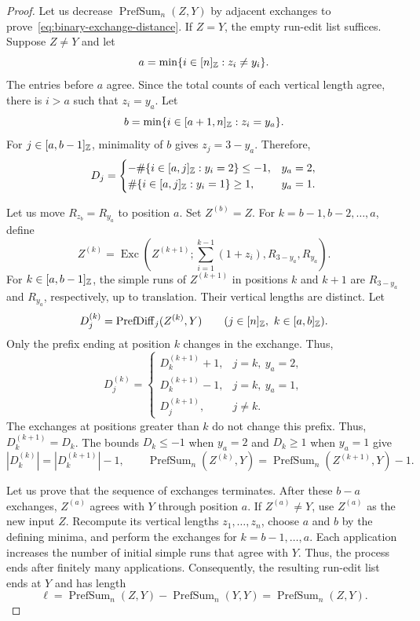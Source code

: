 \begin{proof}
Let us decrease $\operatorname{PrefSum}_n(Z,Y)$ by adjacent exchanges to prove~\eqref{eq:binary-exchange-distance}.
If $Z=Y$, the empty run-edit list suffices. Suppose $Z\ne Y$ and let
\[
 a=\min\{i\in[n]_{\mathbb Z}:z_i\ne y_i\}.
\]
The entries before $a$ agree. Since the total counts of each vertical length agree, there is $i>a$ such that $z_i=y_a$.
Let
\[
 b=\min\{i\in[a+1,n]_{\mathbb Z}:z_i=y_a\}.
\]
For $j\in[a,b-1]_{\mathbb Z}$, minimality of $b$ gives $z_j=3-y_a$. Therefore,
\[
 D_j=\begin{cases}
 -\#\{i\in[a,j]_{\mathbb Z}:y_i=2\}\le-1,&y_a=2,\\
 \#\{i\in[a,j]_{\mathbb Z}:y_i=1\}\ge1,&y_a=1.
 \end{cases}
\]

Let us move $R_{z_b}=R_{y_a}$ to position $a$.
Set $Z^{(b)}=Z$. For $k=b-1,b-2,\ldots,a$, define
\[
 Z^{(k)}=\operatorname{Exc}\left(Z^{(k+1)};
 \sum_{i=1}^{k-1}(1+z_i),R_{3-y_a},R_{y_a}\right).
\]
For $k\in[a,b-1]_{\mathbb Z}$, the simple runs of $Z^{(k+1)}$ in positions $k$ and $k+1$ are $R_{3-y_a}$ and $R_{y_a}$, respectively, up to translation.
Their vertical lengths are distinct. Let
\[
 D_j^{(k)}=\operatorname{PrefDiff}_j(Z^{(k)},Y)
 \qquad(j\in[n]_{\mathbb Z},\ k\in[a,b]_{\mathbb Z}).
\]
Only the prefix ending at position $k$ changes in the exchange. Thus,
\[
 D_j^{(k)}=\begin{cases}
 D_k^{(k+1)}+1,&j=k,\ y_a=2,\\
 D_k^{(k+1)}-1,&j=k,\ y_a=1,\\
 D_j^{(k+1)},&j\ne k.
 \end{cases}
\]
The exchanges at positions greater than $k$ do not change this prefix. Thus, $D_k^{(k+1)}=D_k$.
The bounds $D_k\le-1$ when $y_a=2$ and $D_k\ge1$ when $y_a=1$ give
\[
 |D_k^{(k)}|=|D_k^{(k+1)}|-1,\qquad
 \operatorname{PrefSum}_n(Z^{(k)},Y)
 =\operatorname{PrefSum}_n(Z^{(k+1)},Y)-1.
\]

Let us prove that the sequence of exchanges terminates.
After these $b-a$ exchanges, $Z^{(a)}$ agrees with $Y$ through position $a$.
If $Z^{(a)}\ne Y$, use $Z^{(a)}$ as the new input $Z$.
Recompute its vertical lengths $z_1,\ldots,z_n$, choose $a$ and $b$ by the defining minima, and perform the exchanges for $k=b-1,\ldots,a$.
Each application increases the number of initial simple runs that agree with $Y$. Thus, the process ends after finitely many applications.
Consequently, the resulting run-edit list ends at $Y$ and has length
\[
 \ell=\operatorname{PrefSum}_n(Z,Y)-\operatorname{PrefSum}_n(Y,Y)
 =\operatorname{PrefSum}_n(Z,Y).
\]
\end{proof}

